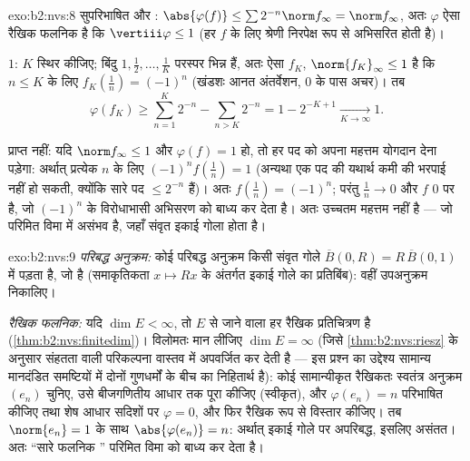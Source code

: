 \begin{solution}{exo:b2:nvs:8}
सुपरिभाषित और : $\abs{\varphi(f)} \leq \sum 2^{-n}
\norm f_\infty = \norm f_\infty$, अतः $\varphi$ ऐसा रैखिक फलनिक है कि $\vertiii\varphi \leq 1$ (हर $f$ के
लिए श्रेणी निरपेक्ष रूप से अभिसरित होती है)।

 $1$: $K$ स्थिर कीजिए; बिंदु $1, \frac12, \dots, \frac1K$ परस्पर भिन्न हैं, अतः ऐसा 
$f_K$, $\norm{f_K}_\infty
\leq 1$ है कि $n \leq K$ के लिए $f_K(\frac1n) = (-1)^n$ (खंडशः आनत अंतर्वेशन, $0$ के पास अचर)।
तब
\[
\varphi(f_K) \geq \sum_{n=1}^{K} 2^{-n} - \sum_{n > K} 2^{-n}
= 1 - 2^{-K+1} \xrightarrow[K \to \infty]{} 1 .
\]

प्राप्त नहीं: यदि $\norm f_\infty \leq 1$ और $\varphi(f) = 1$ हो, तो हर पद को अपना महत्तम योगदान देना
पड़ेगा: अर्थात् प्रत्येक $n$ के लिए $(-1)^n f(\frac1n) = 1$ (अन्यथा एक पद की यथार्थ कमी की
भरपाई नहीं हो सकती, क्योंकि सारे पद $\leq 2^{-n}$ हैं)। अतः $f(\frac1n) = (-1)^n$; परंतु $\frac1n \to 0$ और $f$
$0$ पर  है, जो $(-1)^n$ के विरोधाभासी अभिसरण को बाध्य कर देता है। अतः
उच्चतम महत्तम नहीं है --- जो परिमित विमा में असंभव है, जहाँ संवृत इकाई
गोला  होता है।
\end{solution}

\begin{solution}{exo:b2:nvs:9}
\emph{परिबद्ध अनुक्रम:} कोई परिबद्ध अनुक्रम किसी संवृत गोले $\overline B(0, R) = R\,\overline B(0,1)$ में
पड़ता है, जो  है (समाकृतिकता $x \mapsto Rx$ के अंतर्गत  इकाई गोले का
प्रतिबिंब): वहीं उपअनुक्रम निकालिए।

\emph{रैखिक फलनिक:} यदि $\dim E < \infty$, तो $E$ से जाने वाला हर रैखिक प्रतिचित्रण
 है (\cref{thm:b2:nvs:finitedim})। विलोमतः मान लीजिए $\dim E = \infty$ (जिसे \cref{thm:b2:nvs:riesz} के अनुसार संहतता वाली
परिकल्पना वास्तव में अपवर्जित कर देती है --- इस प्रश्न का उद्देश्य
सामान्य मानदंडित समष्टियों में दोनों गुणधर्मों के बीच का निहितार्थ है):
कोई सामान्यीकृत रैखिकतः स्वतंत्र अनुक्रम $(e_n)$ चुनिए, उसे बीजगणितीय आधार
तक पूरा कीजिए (स्वीकृत), और $\varphi(e_n) = n$ परिभाषित कीजिए तथा शेष आधार सदिशों पर
$\varphi = 0$, और फिर रैखिक रूप से विस्तार कीजिए। तब $\norm{e_n} = 1$ के साथ $\abs{\varphi(e_n)} = n$: अर्थात्
इकाई गोले पर अपरिबद्ध, इसलिए असंतत। अतः ``सारे फलनिक '' परिमित विमा
को बाध्य कर देता है।
\end{solution}

